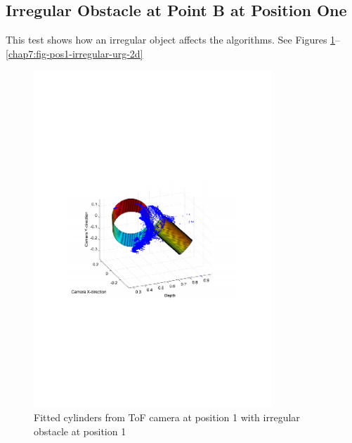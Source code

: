 \subsection{Irregular Obstacle at Point B at Position One}
This test shows how an irregular object affects the algorithms. See Figures 
\ref{chap7:fig-pos1-irregular-tof-3d}--\ref{chap7:fig-pos1-irregular-urg-2d} 
\begin{figure}[htbp]
    \centering
    \includegraphics[width=0.8\textwidth]{pics/pos1-irregular-tof-3d}
    \caption{Fitted cylinders from ToF camera at position 1 with irregular obstacle at
    position 1}
    \label{chap7:fig-pos1-irregular-tof-3d}
\end{figure}
